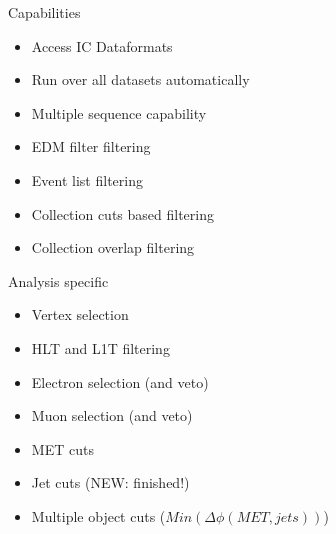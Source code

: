 \documentclass[8pt]{beamer}
\begin{document}
\begin{frame}

\begin{block}{Capabilities}
 
  \begin{itemize}
   \item Access IC Dataformats
   \item Run over all datasets automatically
   \item Multiple sequence capability
   \item EDM filter filtering
   \item Event list filtering
   \item Collection cuts based filtering
   \item Collection overlap filtering
  \end{itemize}

\end{block}
 
\begin{block}{Analysis specific}

  \begin{itemize}
   \item Vertex selection
   \item HLT and L1T filtering
   \item Electron selection (and veto)
   \item Muon selection (and veto)
   \item MET cuts
   \item Jet cuts (NEW: finished!)
   \item Multiple object cuts ($Min(\Delta\phi(MET,jets))$)
  \end{itemize}

\end{block}

\end{frame}
\end{document}
